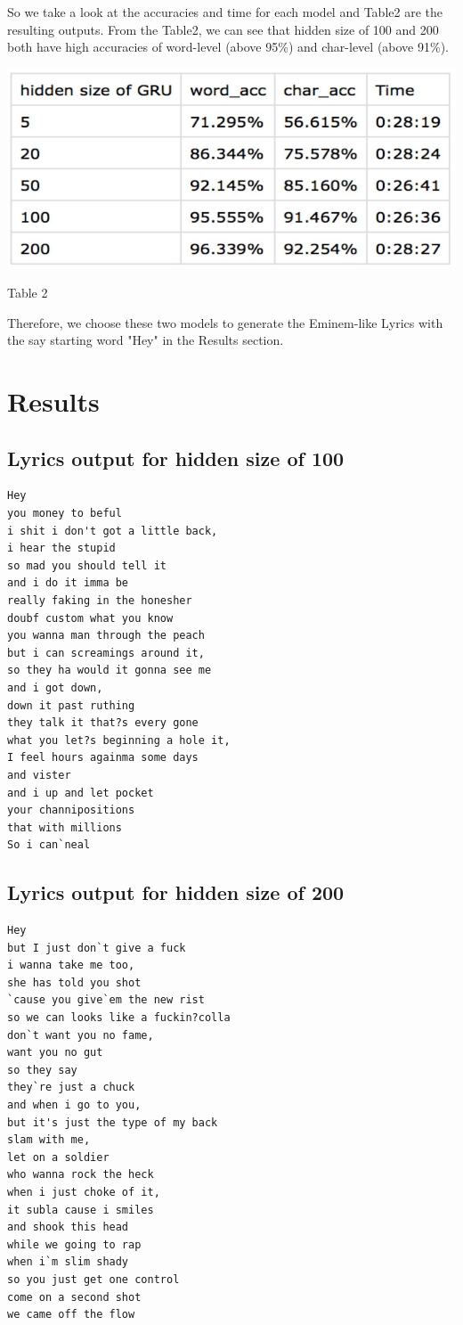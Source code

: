 \documentclass[11pt,a4paper]{article}
\begin{document}
So we take a look at the accuracies and time for each model and Table2 are the resulting outputs. From the Table2, we can see that hidden size of 100 and 200 both have high accuracies of word-level (above 95\%) and char-level (above 91\%). 

\includegraphics[scale=0.8]{table2.png}
\centerline{Table 2}

Therefore, we choose these two models to generate the Eminem-like Lyrics with the say starting word "Hey" in the Results section.

\section{Results}
\subsection{Lyrics output for hidden size of 100}
\begin{verbatim}
Hey
you money to beful
i shit i don't got a little back, 
i hear the stupid 
so mad you should tell it 
and i do it imma be 
really faking in the honesher 
doubf custom what you know 
you wanna man through the peach
but i can screamings around it, 
so they ha would it gonna see me
and i got down, 
down it past ruthing 
they talk it that?s every gone
what you let?s beginning a hole it, 
I feel hours againma some days 
and vister
and i up and let pocket 
your channipositions 
that with millions
So i can`neal
\end{verbatim}

\subsection{Lyrics output for hidden size of 200}
\begin{verbatim}
Hey
but I just don`t give a fuck 
i wanna take me too, 
she has told you shot
`cause you give`em the new rist 
so we can looks like a fuckin?colla
don`t want you no fame, 
want you no gut
so they say 
they`re just a chuck
and when i go to you, 
but it's just the type of my back
slam with me, 
let on a soldier 
who wanna rock the heck
when i just choke of it, 
it subla cause i smiles 
and shook this head 
while we going to rap
when i`m slim shady
so you just get one control
come on a second shot 
we came off the flow
\end{verbatim}
\end{document}
